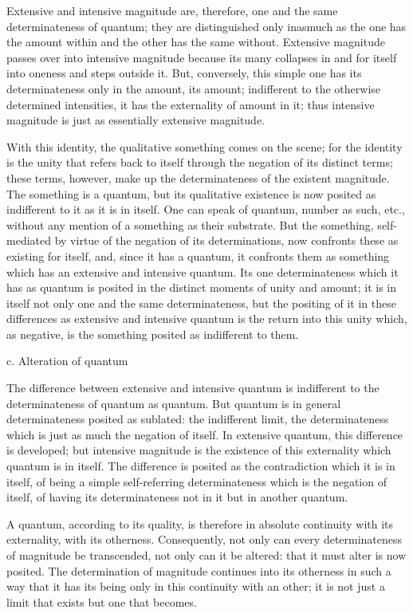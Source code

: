 Extensive and intensive magnitude are, therefore,
one and the same determinateness of quantum;
they are distinguished only inasmuch as
the one has the amount within
and the other has the same without.
Extensive magnitude passes over into intensive magnitude
because its many collapses in and for itself
into oneness and steps outside it.
But, conversely, this simple one
has its determinateness only in the amount, its amount;
indifferent to the otherwise determined intensities,
it has the externality of amount in it;
thus intensive magnitude is just as essentially extensive magnitude.

With this identity, the qualitative something comes on the scene;
for the identity is the unity that refers back to itself
through the negation of its distinct terms;
these terms, however, make up the determinateness of
the existent magnitude.
The something is a quantum, but its qualitative existence is
now posited as indifferent to it as it is in itself.
One can speak of quantum, number as such, etc.,
without any mention of a something as their substrate.
But the something, self-mediated by virtue of the negation
of its determinations, now confronts these as existing for itself,
and, since it has a quantum, it confronts them as something
which has an extensive and intensive quantum.
Its one determinateness which it has as quantum
is posited in the distinct moments of unity and amount;
it is in itself not only one and the same determinateness,
but the positing of it in these differences as
extensive and intensive quantum is the return into this unity
which, as negative, is the something posited as indifferent to them.

c. Alteration of quantum

The difference between extensive and intensive quantum is
indifferent to the determinateness of quantum as quantum.
But quantum is in general
determinateness posited as sublated:
the indifferent limit, the determinateness
which is just as much the negation of itself.
In extensive quantum, this difference is developed;
but intensive magnitude is the existence of
this externality which quantum is in itself.
The difference is posited as the contradiction which it is in itself,
of being a simple self-referring determinateness
which is the negation of itself,
of having its determinateness not in it
but in another quantum.

A quantum, according to its quality, is therefore
in absolute continuity with its externality, with its otherness.
Consequently, not only can every determinateness of magnitude
be transcended, not only can it be altered:
that it must alter is now posited.
The determination of magnitude continues
into its otherness in such a way that
it has its being only in this continuity with an other;
it is not just a limit that exists but one that becomes.

